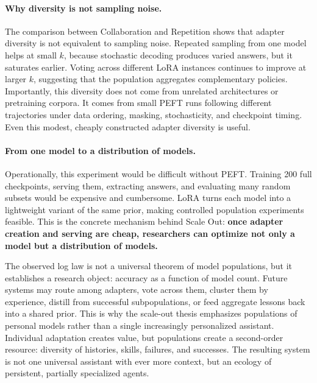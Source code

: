 \documentclass{llmxive}
\begin{document}

\paragraph{Why diversity is not sampling noise.}

The comparison between Collaboration and Repetition shows that adapter diversity is not equivalent to sampling noise. Repeated sampling from one model helps at small \(k\), because stochastic decoding produces varied answers, but it saturates earlier. Voting across different LoRA instances continues to improve at larger \(k\), suggesting that the population aggregates complementary policies. Importantly, this diversity does not come from unrelated architectures or pretraining corpora. It comes from small PEFT runs following different trajectories under data ordering, masking, stochasticity, and checkpoint timing. Even this modest, cheaply constructed adapter diversity is useful.

\paragraph{From one model to a distribution of models.}
Operationally, this experiment would be difficult without PEFT. Training 200 full checkpoints, serving them, extracting answers, and evaluating many random subsets would be expensive and cumbersome. LoRA turns each model into a lightweight variant of the same prior, making controlled population experiments feasible. This is the concrete mechanism behind Scale Out: \textbf{once adapter creation and serving are cheap, researchers can optimize not only a model but a distribution of models.}

The observed log law is not a universal theorem of model populations, but it establishes a research object: accuracy as a function of model count. Future systems may route among adapters, vote across them, cluster them by experience, distill from successful subpopulations, or feed aggregate lessons back into a shared prior. This is why the scale-out thesis emphasizes populations of personal models rather than a single increasingly personalized assistant. Individual adaptation creates value, but populations create a second-order resource: diversity of histories, skills, failures, and successes. The resulting system is not one universal assistant with ever more context, but an ecology of persistent, partially specialized agents.
\end{document}
